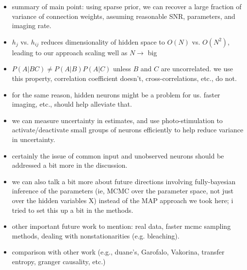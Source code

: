 \begin{itemize}
\item summary of main point: using sparse prior, we can recover a large fraction of variance of connection weights, assuming reasonable SNR, parameters, and imaging rate.
\item $h_j$ vs. $h_{ij}$ reduces dimensionality of hidden space to $O(N)$ vs. $O(N^2)$, leading to our approach scaling well as $N \rightarrow$ big
\item $P(A|BC)\neq P(A|B)P(A|C)$ unless $B$ and $C$ are uncorrelated.  we use this property, correlation coefficient doesn't, cross-correlations, etc., do not.
\item for the same reason, hidden neurons might be a problem for us.  faster imaging, etc., should help alleviate that.
\item we can measure uncertainty in estimates, and use photo-stimulation to activate/deactivate small groups of neurons efficiently to help reduce variance in uncertainty.
\item certainly the issue of common input and unobserved neurons should be addressed a bit more in the discussion.  
\item we can also talk a bit more about future directions involving fully-bayesian inference of the parameters (ie, MCMC over the parameter space, not just over the hidden variables X) instead of the MAP approach we took here; i tried to set this up a bit in the methods.  
\item other important future work to mention: real data, faster mcmc sampling methods, dealing with nonstationarities (e.g. bleaching).
\item comparison with other work (e.g., duane's, Garofalo, Vakorina, transfer entropy, granger causality, etc.)
\end{itemize}

